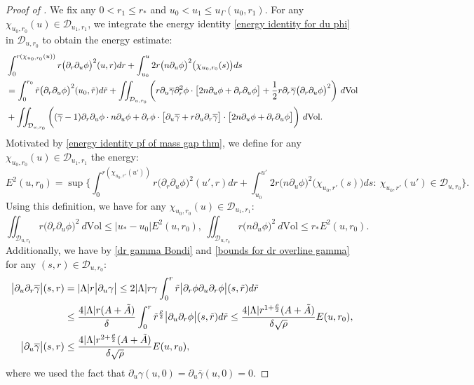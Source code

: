 \documentclass[11pt]{article}
\numberwithin{equation}{section}
\begin{document}
\begin{proof}[Proof of ]
    We fix any $0<r_1\leq r_*$ and $u_0<u_1\leq u_{\Gamma}(u_0,r_1).$ For any $\chi_{u_0,r_0}(u)\in\mathcal{D}_{u_1,r_1}$, we integrate the energy identity \eqref{energy identity for du phi} in $\mathcal{D}_{u,r_0}$ to obtain the energy estimate:
    \begin{align}\label{energy identity pf of mass gap thm}
        &\int_0^{r(\chi_{u_0,r_0}(u))}r\big(\partial_r\partial_u\phi\big)^2(u,r)dr+\int_{u_0}^{u}2r\big(n\partial_u\phi\big)^2\big(\chi_{u_0,r_0}(s)\big)ds\\
        &=\int_0^{r_0}\Tilde{r}\big(\partial_r\partial_u\phi\big)^2(u_0,\Tilde{r})d\Tilde{r}+\iint_{\mathcal{D}_{u,r_0}}\bigg(r\partial_u\overline{\gamma}\partial_r^2\phi\cdot \big[2n\partial_u\phi+\partial_r\partial_u\phi\big]+\frac{1}{2}r\partial_r\overline{\gamma}\big(\partial_r\partial_u\phi\big)^2\bigg)\ d\mathrm{Vol}\notag\\
        &+\iint_{\mathcal{D}_{u,r_0}}\bigg((\overline{\gamma}-1)\partial_r\partial_u\phi\cdot n\partial_u\phi+\partial_r\phi\cdot\big[\partial_u\overline{\gamma}+r\partial_u\partial_r\overline{\gamma}\big]\cdot\big[2n\partial_u\phi+\partial_r\partial_u\phi\big]\bigg)\ d\mathrm{Vol}.\notag
    \end{align}
    Motivated by \eqref{energy identity pf of mass gap thm}, we define for any $\chi_{u_0,r_0}(u)\in\mathcal{D}_{u_1,r_1}$ the energy:
    \[E^2(u,r_0)=\sup\bigg\{\int_0^{r(\chi_{u_0,r'}(u'))}r\big(\partial_r\partial_u\phi\big)^2(u',r)dr+\int_{u_0}^{u'}2r\big(n\partial_u\phi\big)^2\big(\chi_{u_0,r'}(s)\big)ds:\ \chi_{u_0,r'}(u')\in\mathcal{D}_{u,r_0}\bigg\}.\]
    Using this definition, we have for any $\chi_{u_0,r_0}(u)\in\mathcal{D}_{u_1,r_1}$:
    \begin{equation}\label{bounds for bulk mass gap}
    \iint_{\mathcal{D}_{u,r_0}}r\big(\partial_r\partial_u\phi\big)^2\ d\mathrm{Vol}\leq|u_*-u_0|E^2(u,r_0),\ \iint_{\mathcal{D}_{u,r_0}}r\big(n\partial_u\phi\big)^2\ d\mathrm{Vol}\leq r_*E^2(u,r_0).
    \end{equation}
    Additionally, we have by \eqref{dr gamma Bondi} and \eqref{bounds for dr overline gamma} for any $(s,r)\in\mathcal{D}_{u,r_0}$:
    \begin{align}
    \big|\partial_u\partial_r\overline{\gamma}\big|(s,r)&=|\Lambda|r\big|\partial_u\gamma\big|\leq2|\Lambda|r\gamma\int_0^r\Tilde{r}\big|\partial_r\phi\partial_u\partial_r\phi\big|(s,\Tilde{r})d\Tilde{r}\label{du dr gamma bar}\\
    &\leq\frac{4|\Lambda|r(A+\Tilde{A})}{\delta}\int_0^r\Tilde{r}^{\frac{\rho}{2}}\big|\partial_u\partial_r\phi\big|(s,\Tilde{r})d\Tilde{r}\leq\frac{4|\Lambda|r^{1+\frac{\rho}{2}}(A+\Tilde{A})}{\delta\sqrt{\rho}}E(u,r_0),\notag\\
    \big|\partial_u\overline{\gamma}\big|(s,r)&\leq\frac{4|\Lambda|r^{2+\frac{\rho}{2}}(A+\Tilde{A})}{\delta\sqrt{\rho}}E(u,r_0),\label{du gamma bar}
\end{align}
where we used the fact that $\partial_u\gamma(u,0)=\partial_u\overline{\gamma}(u,0)=0.$


\end{proof}
\end{document}
